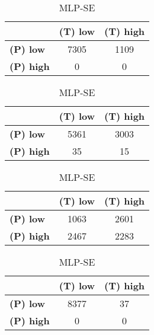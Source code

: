 \begin{landscape}
\begin{table}[htbp]
\begin{minipage}{.3\textwidth}
\begin{tabular}{|l|c|c|}
\hline
					& \textbf{(T) low}	& \textbf{(T) high}	\\ \hline
\textbf{(P) low}	& 7305				& 1109				\\ \hline
\textbf{(P) high}	& 0					& 0					\\ \hline
\end{tabular}
\end{minipage}\hfill
\begin{minipage}{.3\textwidth}
\tiny
\caption*{MLP-AT}
\begin{tabular}{|l|c|c|}
\hline
					& \textbf{(T) low}	& \textbf{(T) high}	\\ \hline
\textbf{(P) low}	& 5361				& 3003				\\ \hline
\textbf{(P) high}	& 35				& 15				\\ \hline
\end{tabular}
\end{minipage}\hfill
\begin{minipage}{.3\textwidth}
\tiny
\caption*{MLP-PL}
\begin{tabular}{|l|c|c|}
\hline
					& \textbf{(T) low}	& \textbf{(T) high}	\\ \hline
\textbf{(P) low}	& 1063				& 2601				\\ \hline
\textbf{(P) high}	& 2467				& 2283				\\ \hline
\end{tabular}
\end{minipage}\hfill
\begin{minipage}{.3\textwidth}
\tiny
\caption*{MLP-SE}
\begin{tabular}{|l|c|c|}
\hline
					& \textbf{(T) low}	& \textbf{(T) high}	\\ \hline
\textbf{(P) low}	& 8377				& 37				\\ \hline
\textbf{(P) high}	& 0					& 0					\\ \hline
\end{tabular}
\end{minipage}\hfill
\end{table}
\end{landscape}